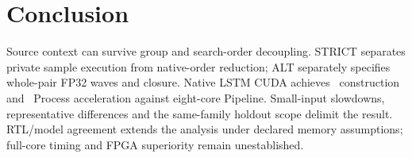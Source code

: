 \section{Conclusion}
Source context can survive group and search-order decoupling. STRICT separates private sample execution from native-order reduction; ALT separately specifies whole-pair FP32 waves and closure. Native LSTM CUDA achieves \LstmPipeBuild\ construction and \LstmPipeProc\ Process acceleration against eight-core Pipeline. Small-input slowdowns, representative differences and the same-family holdout scope delimit the result. RTL/model agreement extends the analysis under declared memory assumptions; full-core timing and FPGA superiority remain unestablished.
